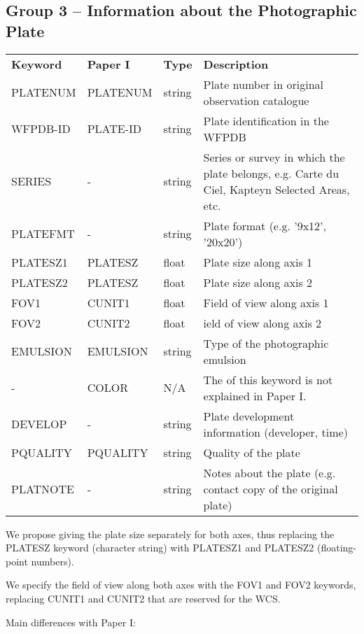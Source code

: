 \documentclass[11pt]{ivoa}
\begin{document}
\subsection{Group 3 – Information about the Photographic Plate}

\begin{inlinetable}
\footnotesize
\begin{tabular}{lllp{}}
\sptablerule
\textbf{Keyword}&\textbf{Paper I}&\textbf{Type}&\textbf{Description}\\
\sptablerule
PLATENUM &PLATENUM &string &Plate number in original observation
catalogue\\
WFPDB-ID &PLATE-ID &string &Plate identification in the WFPDB\\
SERIES   &  -      &string &Series or survey in which the plate belongs,
e.g. Carte du Ciel, Kapteyn Selected Areas, etc.\\
PLATEFMT &-        &string &Plate format (e.g. '9x12', '20x20')\\
PLATESZ1 &PLATESZ  &float  &Plate size along axis 1\\
PLATESZ2 &PLATESZ  &float  &Plate size along axis 2\\
FOV1     &CUNIT1   &float  &Field of view along axis 1\\
FOV2     &CUNIT2   &float  &ield of view along axis 2\\
EMULSION &EMULSION &string &Type of the photographic emulsion\\
-        &COLOR    &N/A    &The of this keyword is not explained in Paper
         I.\\
DEVELOP  &-        &string &Plate development information (developer,
time)\\
PQUALITY &PQUALITY &string &Quality of the plate\\
PLATNOTE &-        &string &Notes about the plate (e.g. contact copy of
the original plate)\\
\end{tabular}
\end{inlinetable}

We propose giving the plate size separately for both axes, thus replacing the PLATESZ keyword (character string) with PLATESZ1 and PLATESZ2 (floating-point numbers).

We specify the field of view along both axes with the FOV1 and FOV2 keywords, replacing CUNIT1 and CUNIT2 that are reserved for the WCS.

Main differences with Paper I:
\end{document}

